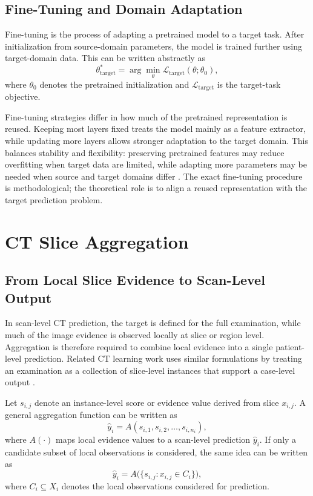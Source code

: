 \subsection{Fine-Tuning and Domain Adaptation}
\label{sec:fine_tuning_domain_adaptation}

Fine-tuning is the process of adapting a pretrained model to a target task. After initialization from source-domain parameters, the model is trained further using target-domain data. This can be written abstractly as
\[
\theta_{\mathrm{target}}^{*}
=
\arg\min_{\theta}
\mathcal{L}_{\mathrm{target}}(\theta; \theta_0),
\]
where \(\theta_0\) denotes the pretrained initialization and \(\mathcal{L}_{\mathrm{target}}\) is the target-task objective.

Fine-tuning strategies differ in how much of the pretrained representation is reused. Keeping most layers fixed treats the model mainly as a feature extractor, while updating more layers allows stronger adaptation to the target domain. This balances stability and flexibility: preserving pretrained features may reduce overfitting when target data are limited, while adapting more parameters may be needed when source and target domains differ \cite{kim2022transfer}. The exact fine-tuning procedure is methodological; the theoretical role is to align a reused representation with the target prediction problem.



\section{CT Slice Aggregation}
\label{sec:ct_slice_aggregation}

\subsection{From Local Slice Evidence to Scan-Level Output}
\label{sec:local_slice_to_scan_output}

In scan-level CT prediction, the target is defined for the full examination, while much of the image evidence is observed locally at slice or region level. Aggregation is therefore required to combine local evidence into a single patient-level prediction. Related CT learning work uses similar formulations by treating an examination as a collection of slice-level instances that support a case-level output \cite{qi2021drmil,xue2023copdmil}.

Let \(s_{i,j}\) denote an instance-level score or evidence value derived from slice \(x_{i,j}\). A general aggregation function can be written as
\[
\hat{y}_i = A(s_{i,1}, s_{i,2}, \dots, s_{i,n_i}),
\]
where \(A(\cdot)\) maps local evidence values to a scan-level prediction \(\hat{y}_i\). If only a candidate subset of local observations is considered, the same idea can be written as
\[
\hat{y}_i = A\bigl(\{s_{i,j} : x_{i,j} \in C_i\}\bigr),
\]
where \(C_i \subseteq X_i\) denotes the local observations considered for prediction.

